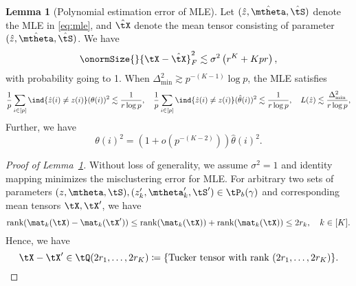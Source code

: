 \documentclass[lettersize,onecolumn,journal]{IEEEtran}
\theoremstyle{definition}
\newtheorem{lem}{Lemma}
\theoremstyle{definition}
\newcommand{\of}[1]{\left(#1\right)}
\begin{document}
{
\color{blue}

   
\begin{lem}[Polynomial estimation error of MLE]\label{lem:poly_mle_degree}  Let $(\hat z, \hat \mtheta, \hat \tS)$ denote the MLE in \eqref{eq:mle}, and $\hat \tX$ denote the mean tensor consisting of parameter $(\hat z, \hat \mtheta, \hat \tS)$. We have 
\begin{equation}
    \onormSize{}{\tX - \hat \tX}_F^2 \lesssim \sigma^2 \of{ r^{K} + K p r},
\end{equation}
with probability going to 1. 
When $\Delta_{\min}^2 \gtrsim p^{-(K-1)} \log p$, the MLE satisfies
\begin{equation}
    \frac{1}{p} \sum_{i \in [p]} \ind\{ \hat z(i) \neq z(i) \} (\theta(i))^2 \lesssim \frac{1}{r \log p}, \quad \frac{1}{p} \sum_{i \in [p]} \ind\{ \hat z(i) \neq z(i) \} (\hat \theta(i))^2 \lesssim \frac{1}{r \log p} ,\quad   L(\hat z) \lesssim \frac{\Delta_{\min}^2}{r \log p},
\end{equation}
Further, we have 
\begin{equation}
     \theta(i)^2 = (1 + o(p^{-(K-2)})) \hat \theta(i)^2.
 \end{equation}
\end{lem}

\begin{proof}[Proof of Lemma~\ref{lem:poly_mle_degree}] Without loss of generality, we assume $\sigma^2 = 1$ and identity mapping minimizes the misclustering error for MLE.
For arbitrary two sets of parameters $(z, \mtheta, \tS), (z_k', \mtheta_k', \tS') \in \tP_b(\gamma)$ and corresponding mean tensors $\tX, \tX'$, we have 
\begin{equation}
    \text{rank}(\mat_k(\tX) - \mat_k(\tX')) \leq \text{rank}(\mat_k(\tX)) + \text{rank}(\mat_k(\tX)) \leq 2 r_k, \quad k \in [K].
\end{equation}
Hence, we have
\begin{equation}\label{eq:dtbm_tucker}
    \tX - \tX' \in \tQ(2r_1, \ldots, 2 r_K) \coloneqq \{ \text{Tucker tensor with rank }(2r_1, \ldots, 2 r_K) \}.
\end{equation}


\end{proof}}
\end{document}
